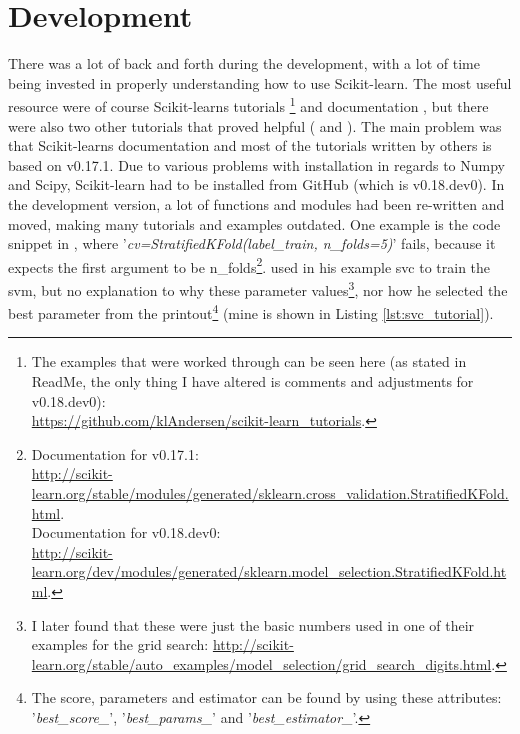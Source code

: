 \section{Development}
\label{sec:development}
There was a lot of back and forth during the development, with a lot of time being invested in properly understanding how to use Scikit-learn.
The most useful resource were of course Scikit-learns tutorials \cite{Scikitlearn.org2016j}\footnote{
	The examples that were worked through can be seen here (as stated in ReadMe, the only thing I have altered is comments and adjustments for v0.18.dev0): \\
	\url{https://github.com/klAndersen/scikit-learn_tutorials}.
	} and documentation \cite{Scikitlearn.org2016,Scikitlearn.org2016h}, 
but there were also two other tutorials that proved helpful (\cite{Rehurek2014} and \cite{Elahi2016}).
The main problem was that Scikit-learns documentation and most of the tutorials written by others is based on v0.17.1.
Due to various problems with installation in regards to Numpy and Scipy, Scikit-learn had to be installed from GitHub (which is v0.18.dev0).
In the development version, a lot of functions and modules had been re-written and moved, making many tutorials and examples outdated.
One example is the code snippet in \cite["In $\lbrack$42$\rbrack$"]{Rehurek2014}, where '\emph{cv=StratifiedKFold(label\_train, n\_folds=5)}' fails, 
because it expects the first argument to be n\_folds\footnote{
	Documentation for v0.17.1: \\
	\url{http://scikit-learn.org/stable/modules/generated/sklearn.cross_validation.StratifiedKFold.html}. \\
	Documentation for v0.18.dev0: \\
	\url{http://scikit-learn.org/dev/modules/generated/sklearn.model_selection.StratifiedKFold.html}.
}.
\vspace{0.5em}\newline
\textcite{Rehurek2014} used in his example \gls{svc} to train the \gls{svm}, but no explanation to why these parameter values\footnote{
	I later found that these were just the basic numbers used in one of their examples for the grid search: 
	\url{http://scikit-learn.org/stable/auto_examples/model_selection/grid_search_digits.html}.
},
nor how he selected the best parameter from the printout\footnote{
	The score, parameters and estimator can be found by using these attributes: '\emph{best\_score\_}', '\emph{best\_params\_}' and '\emph{best\_estimator\_}'.
} (mine is shown in Listing \ref{lst:svc_tutorial}).

